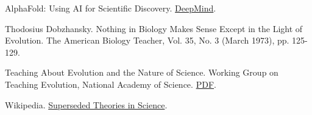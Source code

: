 \documentclass[12pt]{article}
\begin{document}
\begin{thebibliography}{00}
     AlphaFold: Using AI for Scientific Discovery. \href{https://deepmind.com/blog/article/AlphaFold-Using-AI-for-scientific-discovery}{DeepMind}.

     Thodosius Dobzhansky. Nothing in Biology Makes Sense Except in the Light of Evolution. The American Biology Teacher, Vol. 35, No. 3 (March 1973), pp. 125-129.
        
     Teaching About Evolution and the Nature of Science. Working Group on Teaching Evolution, National Academy of Science. \href{http://nap.edu/5787}{PDF}.

     Wikipedia. \href{https://en.wikipedia.org/wiki/Superseded_theories_in_science}{Superseded Theories in Science}.
\end{thebibliography}
\end{document}
